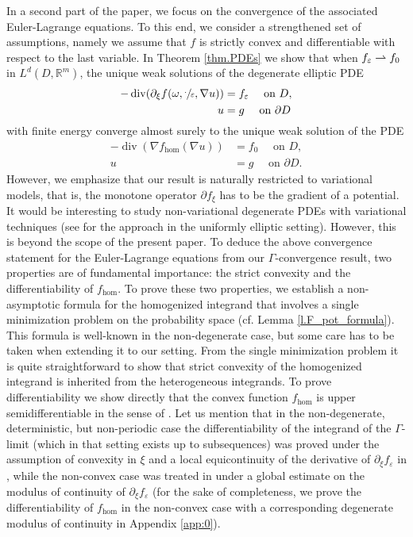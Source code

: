 \documentclass[11pt]{article}
\newcommand{\cf}{cf.\xspace}
\numberwithin{equation}{section}
\def\harptod{\mathrel{\relbar\joinrel\rightharpoonup}}
\def\harpto{\mathchoice{\harptod}{\rightharpoonup}{\rightharpoonup}{\rightharpoonup}}
\DeclareMathOperator{\dive}{div}
\theoremstyle{definition}
\let\e\varepsilon
\let\w\omega
\newcommand{\R}{\mathbb{R}}
\begin{document}
In a second part of the paper, we focus on the convergence of the associated Euler-Lagrange equations. To this end, we consider a strengthened set of assumptions, namely we assume that $f$ is strictly convex and differentiable with respect to the last variable. In Theorem \ref{thm.PDEs} we show that when $f_{\e}\harpto f_0$ in $L^d(D,\R^m)$, the unique weak solutions of the degenerate elliptic PDE
\begin{align*}
-\dive(\partial_{\xi }f(\w,\sfrac{\cdot}{\e},\nabla u))&=f_{\e}\quad\text{ on }D,
\\
u&=g\quad\text{ on }\partial D
\end{align*}
with finite energy converge almost surely to the unique weak solution of the PDE
\begin{align*}
-\dive(\nabla f_{\hom}(\nabla u))&=f_0\quad\text{ on }D,
\\
u&=g\quad\text{ on }\partial D.
\end{align*}
However, we emphasize that our result is naturally restricted to variational models, that is, the monotone operator $\partial f_{\xi}$ has to be the gradient of a potential. It would be interesting to study non-variational degenerate PDEs with variational techniques (see \cite{ArMo} for the approach in the uniformly elliptic setting). However, this is beyond the scope of the present paper. To deduce the above convergence statement for the Euler-Lagrange equations from our $\Gamma$-convergence result, two properties are of fundamental importance: the strict convexity and the differentiability of $f_{\hom}$. To prove these two properties, we establish a non-asymptotic formula for the homogenized integrand that involves a single minimization problem on the probability space (\cf Lemma \ref{l.F_pot_formula}). This formula is well-known in the non-degenerate case, but some care has to be taken when extending it to our setting. From the single minimization problem it is quite straightforward to show that strict convexity of the homogenized integrand is inherited from the heterogeneous integrands. To prove differentiability we show directly that the convex function $f_{\hom}$ is upper semidifferentiable in the sense of \cite{BKK}. Let us mention that in the non-degenerate, deterministic, but non-periodic case the differentiability of the integrand of the $\Gamma$-limit (which in that setting exists up to subsequences) was proved under the assumption of convexity in $\xi$ and a local equicontinuity of the derivative of $\partial_{\xi}f_{\e}$ in \cite[Prop.\,3.5]{GiPo}, while the non-convex case was treated in \cite[Th.\,2.8]{ADMZ} under a global estimate on the modulus of continuity of $\partial_{\xi}f_{\e}$ (for the sake of completeness, we prove the differentiability of $f_{\hom}$ in the non-convex case with a corresponding degenerate modulus of continuity in Appendix \ref{app:0}).
\end{document}
